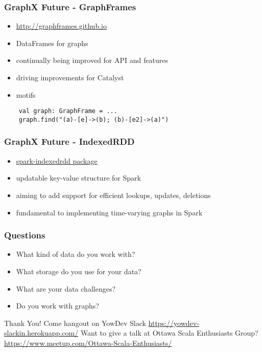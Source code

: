 \documentclass{beamer}
\begin{document}
\begin{frame}[fragile]
    \frametitle{GraphX Future - GraphFrames}
\begin{itemize}
    \item \href{http://graphframes.github.io}{http://graphframes.github.io}
    \item DataFrames for graphs
    \item continually being improved for API and features
    \item driving improvements for Catalyst
    \item motifs
\end{itemize}

{\scriptsize
\begin{verbatim}
    val graph: GraphFrame = ...
    graph.find("(a)-[e]->(b); (b)-[e2]->(a)")
\end{verbatim}
}
\end{frame}

\begin{frame}[fragile]
    \frametitle{GraphX Future - IndexedRDD}
\begin{itemize}
    \item \href{https://spark-packages.org/package/amplab/spark-indexedrdd}{spark-indexedrdd package}
    \item updatable key-value structure for Spark
    \item aiming to add support for efficient lookups, updates, deletions
    \item fundamental to implementing time-varying graphs in Spark
\end{itemize}
\end{frame}

\begin{frame}[fragile]
    \frametitle{Questions}
    \begin{itemize}
        \item What kind of data do you work with?
        \item What storage do you use for your data?
        \item What are your data challenges?
        \item Do you work with graphs?
    \end{itemize}
\end{frame}


\begin{frame}[standout]
    \alert{Thank You!}
    {\center
        {\small
            \alert{Come hangout on YowDev Slack} \linebreak 
            {\scriptsize \href{https://yowdev-slackin.herokuapp.com/}{https://yowdev-slackin.herokuapp.com/}} \linebreak
            \alert{Want to give a talk at Ottawa Scala Enthusiasts Group?} \linebreak
        {\scriptsize \href{https://www.meetup.com/Ottawa-Scala-Enthusiasts/}{https://www.meetup.com/Ottawa-Scala-Enthusiasts/}}
    }
    }
\end{frame}
\end{document}
